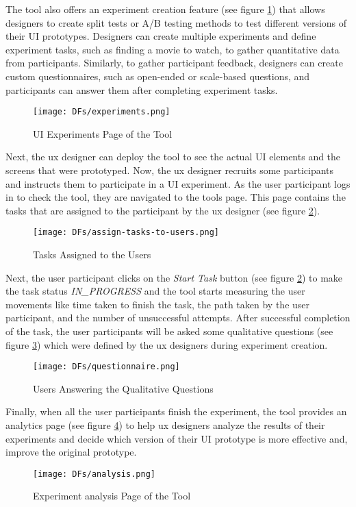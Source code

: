 The tool also offers an experiment creation feature (see figure \ref{implementation:fig:experiments}) that allows designers to create split tests or A/B testing methods to test different versions of their UI prototypes. 
Designers can create multiple experiments and define experiment tasks, such as finding a movie to watch, to gather quantitative data from participants.
Similarly, to gather participant feedback, designers can create custom questionnaires, such as open-ended or scale-based questions, and participants can answer them after completing experiment tasks.
\begin{figure}[ht]
    \centering
    \texttt{[image: DFs/experiments.png]}
    \caption{UI Experiments Page of the Tool}
    \label{implementation:fig:experiments}
\end{figure}

Next, the \ac{ux} designer can deploy the tool to see the actual UI elements and the screens that were prototyped.
Now, the \ac{ux} designer recruits some participants and instructs them to participate in a UI experiment.
As the user participant logs in to check the tool, they are navigated to the tools page. 
This page contains the tasks that are assigned to the participant by the \ac{ux} designer (see figure \ref{implementation:fig:user-tasks}).
\clearpage
\begin{figure}[ht]
    \centering
    \texttt{[image: DFs/assign-tasks-to-users.png]}
    \caption{Tasks Assigned to the Users}
    \label{implementation:fig:user-tasks}
\end{figure}

Next, the user participant clicks on the \textit{Start Task} button (see figure \ref{implementation:fig:user-tasks}) to make the task status \textit{IN\_PROGRESS} and the tool starts measuring the user movements like time taken to finish the task, the path taken by the user participant, and the number of unsuccessful attempts.
After successful completion of the task, the user participants will be asked some qualitative questions (see figure \ref{implementation:fig:user-qualitative}) which were defined by the \ac{ux} designers during experiment creation. 

\begin{figure}[ht]
    \centering
    \texttt{[image: DFs/questionnaire.png]}
    \caption{Users Answering the Qualitative Questions}
    \label{implementation:fig:user-qualitative}
\end{figure}

Finally, when all the user participants finish the experiment, the tool provides an analytics page (see figure \ref{implementation:fig:analysis}) to help \ac{ux} designers analyze the results of their experiments and decide which version of their UI prototype is more effective and, improve the original prototype. 
\begin{figure}[ht]
    \centering
    \texttt{[image: DFs/analysis.png]}
    \caption{Experiment analysis Page of the Tool}
    \label{implementation:fig:analysis}
\end{figure}

